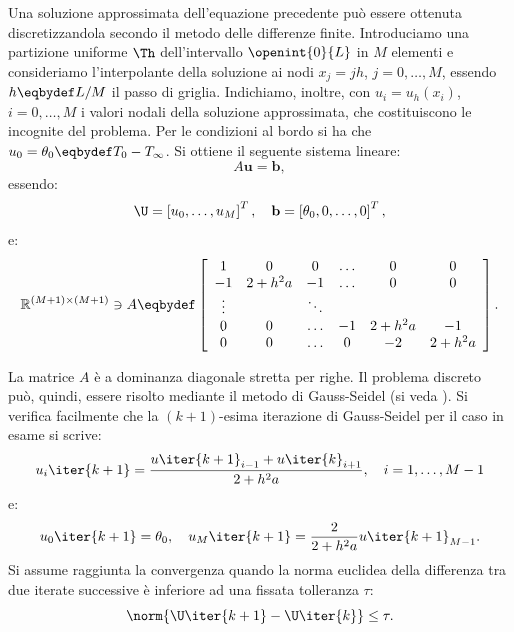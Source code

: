 Una soluzione approssimata dell'equazione precedente pu\`o essere ottenuta discretizzandola secondo il metodo delle differenze finite. Introduciamo una partizione uniforme $\Th$ dell'intervallo $\openint{0}{L}$ in $M$ elementi e consideriamo l'interpolante della soluzione ai nodi $x_j = jh$, $j=0,\ldots,M$, essendo $h\eqbydef L / M$ il passo di griglia. Indichiamo, inoltre, con $u_i=u_h(x_i)$, $i=0,\ldots,M$ i valori nodali della soluzione approssimata, che costituiscono le incognite del problema. Per le condizioni al bordo si ha che $u_0=\theta_0\eqbydef T_0 - T_{\infty}$. Si ottiene il seguente sistema lineare:
\begin{equation}
\label{eq:stfem}
A\mathbf{u}=\mathbf{b},
\end{equation}
essendo:
\begin{equation*}
\U=\left[u_0,\ldots,u_M\right]^T,\quad \mathbf{b}=\left[\theta_0,0,\ldots,0\right]^T,
\end{equation*}
e:
\begin{equation*}
\mathbb{R}^{(M+1)\times (M+1)}\ni A\eqbydef\left[
\begin{array}{ccccccc}
1       & 0         & 0         & \ldots    & 0         & 0     \\
-1      & 2+h^2 a   & -1        & \ldots    & 0         & 0     \\
\vdots  &           & \ddots    &           &           &       \\
0       & 0         & \ldots    & -1        & 2+h^2 a   & -1    \\
0       & 0         & \ldots    & 0         & -2        & 2+h^2 a     \\
\end{array}
\right].
\end{equation*}

La matrice $A$ \`e a dominanza diagonale stretta per righe. Il problema
discreto pu\`o, quindi, essere risolto mediante  il metodo di
Gauss-Seidel (si veda \cite[]{Quarteroni.Sacco.ea:2000}
). Si verifica facilmente che la $(k+1)$-esima iterazione di Gauss-Seidel per il caso in esame si scrive:
\begin{equation*}
u _i\iter{k+1}=\frac{u\iter{k+1}_{i-1} + u\iter{k}_{i+1}}{2 + h^2 a},\quad i=1,\ldots,M-1
\end{equation*}
e:
\begin{equation*}
u_0\iter{k+1} = \theta_0,\quad u _M\iter{k+1}=\frac{2}{2+h^2 a}u\iter{k+1}_{M-1}.
\end{equation*}
Si assume raggiunta la convergenza quando la norma euclidea della differenza tra due iterate successive \`e inferiore ad una fissata tolleranza $\tau$:
\begin{equation*}
\norm{ \U\iter{k+1} - \U\iter{k} }\le\tau.
\end{equation*}

